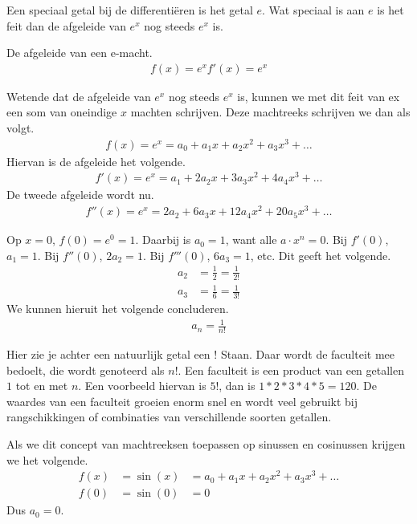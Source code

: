 \documentclass[11pt,fleqn]{book} %
\begin{document}
Een speciaal getal bij de differentiëren is het getal $e$. Wat speciaal is aan $e$ is het feit dan de afgeleide van $e^x$ nog steeds $e^x$ is.
\begin{definition}
De afgeleide van een e-macht.
\begin{align}
f(x)=e^x
f'(x)=e^x
\end{align}
\end{definition}

Wetende dat de afgeleide van $e^x$ nog steeds $e^x$ is, kunnen we met dit feit van ex een som van oneindige $x$ machten schrijven. Deze machtreeks schrijven we dan als volgt.
\begin{align*}
f(x)=e^x=a_0+a_1x+a_2x^2+a_3x^3+\ldots
\end{align*}
Hiervan is de afgeleide het volgende.
\begin{align*}
f'(x)=e^x=a_1+2a_2x+3a_3x^2+4a_4x^3+\ldots
\end{align*}
De tweede afgeleide wordt nu.
\begin{align*}
f''(x)=e^x=2a_2+6a_3x+12a_4x^2+20a_5x^3+\ldots
\end{align*}

Op $x=0$, $f(0)=e^0=1$. Daarbij is $a_0=1$, want alle $a\cdot x^n=0$. Bij $f'(0)$, $a_1=1$. Bij $f''(0)$, $2a_2=1$. Bij $f'''(0)$, $6a_3=1$, etc. Dit geeft het volgende.
\begin{align*}
a_2 &=\frac{1}{2}=\frac{1}{2!}\\
a_3 &=\frac{1}{6}=\frac{1}{3!}
\end{align*}
We kunnen hieruit het volgende concluderen.
\begin{align*}
a_n=\frac{1}{n!}
\end{align*}

Hier zie je achter een natuurlijk getal een $!$ Staan. Daar wordt de faculteit mee bedoelt, die wordt genoteerd als $n!$. Een faculteit is een product van een getallen $1$ tot en met $n$. Een voorbeeld hiervan is $5!$, dan is $1*2*3*4*5= 120$. De waardes van een faculteit groeien enorm snel en wordt veel gebruikt bij rangschikkingen of combinaties van verschillende soorten getallen.

Als we dit concept van machtreeksen toepassen op sinussen en cosinussen krijgen we het volgende.
\begin{align*}
f(x) &=\sin{(x)} &=a_0+a_1x+a_2x^2+a_3x^3+\ldots\\
f(0) &=\sin{(0)} &=0
\end{align*}
Dus $a_0=0$.
\end{document}
